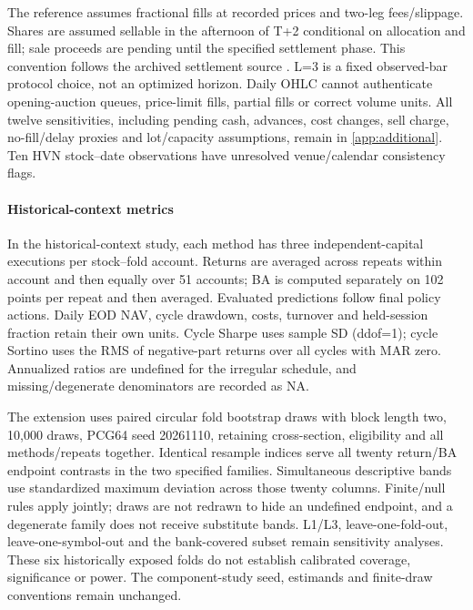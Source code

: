 The reference assumes fractional fills at recorded prices and two-leg fees/slippage. Shares are assumed sellable in the afternoon of T+2 conditional on allocation and fill; sale proceeds are pending until the specified settlement phase. This convention follows the archived settlement source \cite{vsd2022settlement}. L=3 is a fixed observed-bar protocol choice, not an optimized horizon. Daily OHLC cannot authenticate opening-auction queues, price-limit fills, partial fills or correct volume units. All twelve sensitivities, including pending cash, advances, cost changes, sell charge, no-fill/delay proxies and lot/capacity assumptions, remain in \ref{app:additional}. Ten HVN stock--date observations have unresolved venue/calendar consistency flags.

\paragraph{Historical-context metrics}
In the historical-context study, each method has three independent-capital executions per stock--fold account. Returns are averaged across repeats within account and then equally over 51 accounts; BA is computed separately on 102 points per repeat and then averaged. Evaluated predictions follow final policy actions. Daily EOD NAV, cycle drawdown, costs, turnover and held-session fraction retain their own units. Cycle Sharpe uses sample SD (ddof=1); cycle Sortino uses the RMS of negative-part returns over all cycles with MAR zero. Annualized ratios are undefined for the irregular schedule, and missing/degenerate denominators are recorded as NA.

The extension uses paired circular fold bootstrap draws with block length two, 10,000 draws, PCG64 seed 20261110, retaining cross-section, eligibility and all methods/repeats together. Identical resample indices serve all twenty return/BA endpoint contrasts in the two specified families. Simultaneous descriptive bands use standardized maximum deviation across those twenty columns. Finite/null rules apply jointly; draws are not redrawn to hide an undefined endpoint, and a degenerate family does not receive substitute bands. L1/L3, leave-one-fold-out, leave-one-symbol-out and the bank-covered subset remain sensitivity analyses. These six historically exposed folds do not establish calibrated coverage, significance or power. The component-study seed, estimands and finite-draw conventions remain unchanged.

